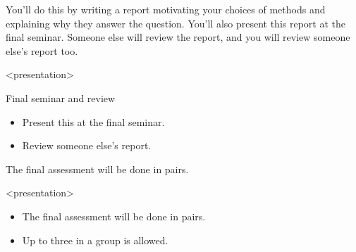 You'll do this by writing a report motivating your choices of methods and 
explaining why they answer the question.
You'll also present this report at the final seminar.
Someone else will review the report, and you will review someone else's report 
too.

\begin{frame}<presentation>
  \begin{block}{Final seminar and review}
    \begin{itemize}
      \item Present this at the final seminar.
      \item Review someone else's report.
    \end{itemize}
  \end{block}
\end{frame}

The final assessment will be done in pairs.

\begin{frame}<presentation>
  \begin{remark}
    \begin{itemize}
      \item The final assessment will be done in pairs.
      \item Up to three in a group is allowed.
    \end{itemize}
  \end{remark}
\end{frame}

%
%
%

